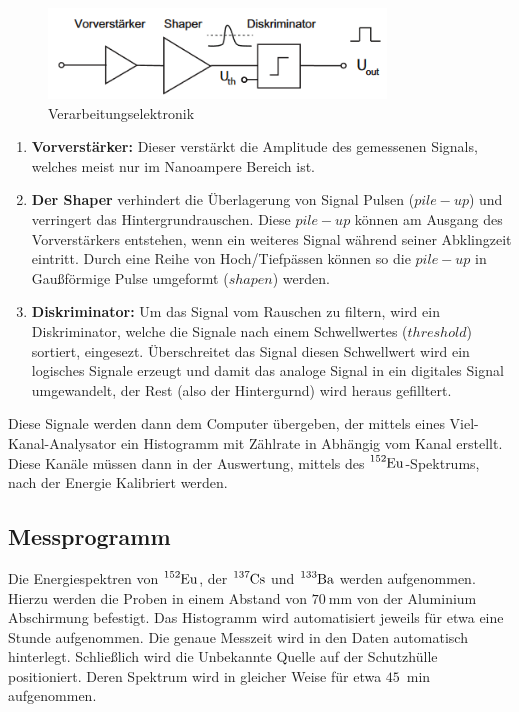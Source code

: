 \begin{figure}
	\centering
	\includegraphics[width=0.8\textwidth]{./Bilder/Elektronik.png}
	\caption{Verarbeitungselektronik \cite{book:kolano}}\label{fig:elek}
\end{figure}

\begin{enumerate}
	\item \textbf{Vorverstärker:} Dieser verstärkt die Amplitude des gemessenen Signals, welches meist nur im Nanoampere Bereich ist. 
	\item \textbf{Der Shaper} verhindert die Überlagerung von Signal Pulsen ($pile-up$) und verringert das Hintergrundrauschen. 
	Diese $pile-up$ können am Ausgang des Vorverstärkers entstehen, wenn ein weiteres Signal während seiner Abklingzeit eintritt.
	Durch eine Reihe von Hoch/Tiefpässen können so die $pile-up$ in Gaußförmige Pulse umgeformt ($shapen$) werden. 
	\item \textbf{Diskriminator:} Um das Signal vom Rauschen zu filtern, wird ein Diskriminator, welche die Signale nach einem Schwellwertes ($threshold$) sortiert, eingesezt.
	Überschreitet das Signal diesen Schwellwert wird ein logisches Signale erzeugt und damit das analoge Signal in ein digitales Signal umgewandelt, 
	der Rest (also der Hintergurnd) wird heraus gefilltert. 
\end{enumerate}

Diese Signale werden dann dem Computer übergeben, der mittels eines Viel-Kanal-Analysator ein Histogramm mit Zählrate in Abhängig vom Kanal erstellt.
Diese Kanäle müssen dann in der Auswertung, mittels des $\ce{^{152}Eu}$-Spektrums, nach der Energie Kalibriert werden.  

\subsection{Messprogramm}
Die Energiespektren von $\ce{^{152}Eu}$, der $\ce{^{137}Cs}$ und $\ce{^{133}Ba}$ werden
aufgenommen. Hierzu werden die Proben in einem Abstand von $\qty{70}{\mm}$ von
der Aluminium Abschirmung befestigt. Das Histogramm wird automatisiert jeweils
für etwa eine Stunde aufgenommen. Die genaue Messzeit wird in den Daten
automatisch hinterlegt. Schließlich wird die Unbekannte Quelle auf der
Schutzhülle positioniert. Deren Spektrum wird in gleicher Weise für etwa
$\qty{45}{\min}$ aufgenommen.
